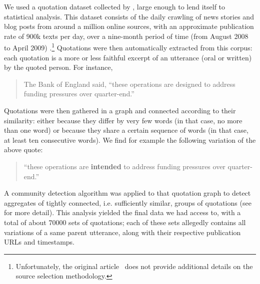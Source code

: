 We used a quotation dataset collected by \citet{Leskovec09}, large enough to lend itself to statistical analysis.
This dataset consists of the daily crawling of news stories and blog posts from around a million online sources, with an approximate publication rate of 900k texts per day, over a nine-month period of time (from August 2008 to April 2009) \cite{Leskovec09-url}.\footnote{Unfortunately, the original article~\citep{Leskovec09} does not provide additional details on the source selection methodology.}
Quotations were then automatically extracted from this corpus: each quotation is a more or less faithful excerpt of an utterance (oral or written) by the quoted person. For instance,
\begin{quote}
The Bank of England said, ``these operations are designed to address funding pressures over quarter-end.''
\end{quote}
Quotations were then gathered in a graph and connected according to their similarity: either because they differ by very few words (in that case, no more than one word) or because they share a certain sequence of words (in that case, at least ten consecutive words). We find for example the following variation of the above quote: \begin{quote}``these operations are \textbf{intended} to address funding pressures over quarter-end.''\end{quote}
A community detection algorithm was applied to that quotation graph to detect aggregates of tightly connected, i.e. sufficiently similar, groups of quotations (see \citet{Leskovec09} for more detail).
This analysis yielded the final data we had access to, with a total of about \num{70000} sets of quotations; each of these sets allegedly contains all variations of a same parent utterance, along with their respective publication URLs and timestamps.

